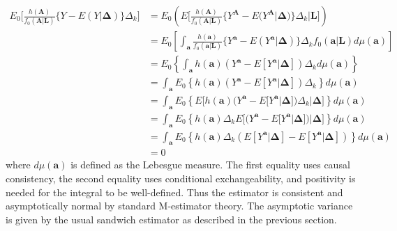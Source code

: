 \documentclass[12pt]{article}
\begin{document}
\begin{align*}
E_{0} \bigg[\frac{h(\bm{A})}{f_{0}(\bm{A} | \bm{L})} \{ Y - E(Y | \bm{\Delta})\} \Delta_{k} \bigg] &= E_{0} \left( E \bigg[\frac{h(\bm{A})}{f_{0}(\bm{A} | \bm{L})} \{ Y^{\bm{A}} - E(Y^{\bm{A}} | \bm{\Delta}) \} \Delta_{k} | \bm{L} \bigg] \right) \\
&= E_{0} \left [ \int_{\bm{a}} \frac{h(\bm{a})}{f_{0}(\bm{a} | \bm{L})}\{ Y^{\bm{a}} - E(Y^{\bm{a}} | \bm{\Delta}) \} \Delta_{k} f_{0}(\bm{a} | \bm{L}) d\mu (\bm{a}) \right ] \\
&= E_{0} \left \{ \int_{\bm{a}} h(\bm{a})(Y^{\bm{a}} - E[Y^{\bm{a}} | \bm{\Delta}])\Delta_{k} d\mu (\bm{a}) \right \} \\
&= \int_{\bm{a}} E_{0} \left \{ h(\bm{a})(Y^{\bm{a}} - E[Y^{\bm{a}} | \bm{\Delta}])\Delta_{k} \right \} d\mu (\bm{a}) \\
&= \int_{\bm{a}} E_{0} \left \{ E \bigg[ h(\bm{a})(Y^{\bm{a}} - E[Y^{\bm{a}} | \bm{\Delta}])\Delta_{k} | \bm{\Delta} \bigg] \right \} d\mu (\bm{a}) \\
&= \int_{\bm{a}} E_{0} \left \{ h(\bm{a})\Delta_{k} E \bigg[ (Y^{\bm{a}} - E[Y^{\bm{a}} | \bm{\Delta}]) | \bm{\Delta} \bigg] \right \} d\mu (\bm{a}) \\
&= \int_{\bm{a}} E_{0} \left \{ h(\bm{a})\Delta_{k} ( E[Y^{\bm{a}} | \bm{\Delta}] - E[Y^{\bm{a}} | \bm{\Delta}] ) \right \} d\mu (\bm{a}) \\
&= 0
\end{align*}
where $d\mu (\bm{a})$ is defined as the Lebesgue measure. The first equality uses causal consistency, the second equality uses conditional exchangeability, and positivity is needed for the integral to be well-defined. Thus the estimator is consistent and asymptotically normal by standard M-estimator theory. The asymptotic variance is given by the usual sandwich estimator as described in the previous section.
\end{document}
